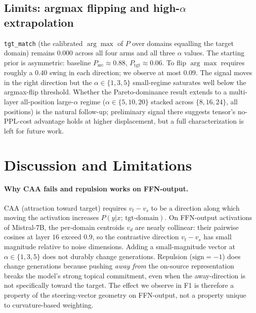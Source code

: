 \documentclass[10pt,twocolumn]{article}
\begin{document}
\subsection{Limits: argmax flipping and high-$\alpha$ extrapolation}
\label{sec:steering-limits}

\texttt{tgt\_match} (the calibrated $\arg\max$ of $P$ over domains equalling the target domain) remains $0.000$ across all four arms and all three $\alpha$ values. The starting prior is asymmetric: baseline $P_{\text{src}}\approx 0.88$, $P_{\text{tgt}}\approx 0.06$. To flip $\arg\max$ requires roughly a $0.40$ swing in each direction; we observe at most $0.09$. The signal moves in the right direction but the $\alpha\in\{1,3,5\}$ small-regime saturates well below the argmax-flip threshold. Whether the Pareto-dominance result extends to a multi-layer all-position large-$\alpha$ regime ($\alpha\in\{5,10,20\}$ stacked across $\{8,16,24\}$, all positions) is the natural follow-up; preliminary signal there suggests tensor's no-PPL-cost advantage holds at higher displacement, but a full characterization is left for future work.

\section{Discussion and Limitations}
\label{sec:disc}

\paragraph{Why CAA fails and repulsion works on FFN-output.} CAA (attraction toward target) requires $v_t-v_s$ to be a direction along which moving the activation increases $P(y|x;\,\text{tgt-domain})$. On FFN-output activations of Mistral-7B, the per-domain centroids $v_d$ are nearly collinear: their pairwise cosines at layer $16$ exceed $0.9$, so the contrastive direction $v_t-v_s$ has small magnitude relative to noise dimensions. Adding a small-magnitude vector at $\alpha\in\{1,3,5\}$ does not durably change generations. Repulsion ($\mathrm{sign}{=}{-}1$) does change generations because pushing \emph{away from} the on-source representation breaks the model's strong topical commitment, even when the away-direction is not specifically toward the target. The effect we observe in F1 is therefore a property of the steering-vector geometry on FFN-output, not a property unique to curvature-based weighting.
\end{document}
